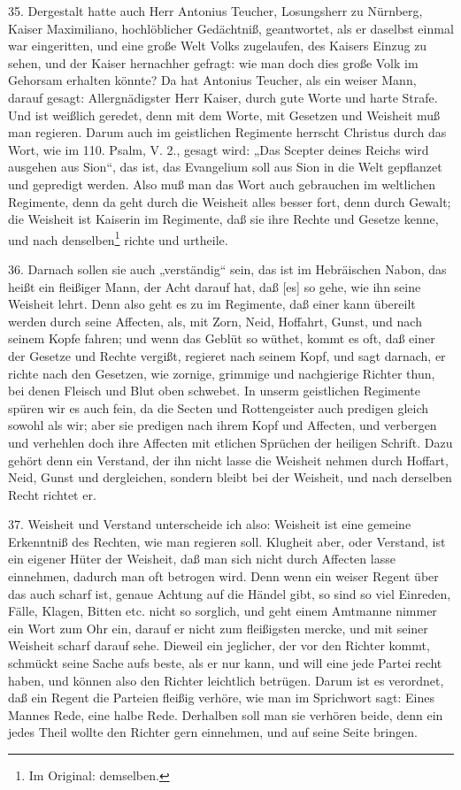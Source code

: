 35. Dergestalt hatte auch Herr Antonius Teucher, Losungsherr zu Nürnberg, Kaiser Maximiliano, hochlöblicher Gedächtniß, geantwortet, als er daselbst einmal war eingeritten, und eine große Welt Volks zugelaufen, des Kaisers Einzug zu sehen, und der Kaiser hernachher gefragt: wie man doch dies große Volk im Gehorsam erhalten könnte? Da hat Antonius Teucher, als ein weiser Mann, darauf gesagt: Allergnädigster Herr Kaiser, durch gute Worte und harte Strafe. Und ist weißlich geredet, denn mit dem Worte, mit Gesetzen und Weisheit muß man regieren. Darum auch im geistlichen Regimente herrscht Christus durch das Wort, wie im 110. Psalm, V. 2., gesagt wird: „Das Scepter deines Reichs wird ausgehen aus Sion“, das ist, das Evangelium soll aus Sion in die Welt gepflanzet und gepredigt werden. Also muß man das Wort auch gebrauchen im weltlichen Regimente, denn da geht durch die Weisheit alles besser fort, denn durch Gewalt; die Weisheit ist Kaiserin im Regimente, daß sie ihre Rechte und Gesetze kenne, und nach denselben\footnote{Im Original: demselben.} richte und urtheile.

36. Darnach sollen sie auch „verständig“ sein, das ist im Hebräischen Nabon, das heißt ein fleißiger Mann, der Acht darauf hat, daß [es] so gehe, wie ihn seine Weisheit lehrt. Denn also geht es zu im Regimente, daß einer kann übereilt werden durch seine Affecten, als, mit Zorn, Neid, Hoffahrt, Gunst, und nach seinem Kopfe fahren; und wenn das Geblüt so wüthet, kommt es oft, daß einer der Gesetze und Rechte
vergißt, regieret nach seinem Kopf, und sagt darnach, er richte nach den Gesetzen, wie zornige, grimmige und nachgierige Richter thun, bei denen Fleisch und Blut oben schwebet. In unserm geistlichen Regimente spüren wir es auch fein, da die Secten und Rottengeister auch predigen gleich sowohl als wir; aber sie predigen nach ihrem Kopf und Affecten, und verbergen und verhehlen doch ihre Affecten mit etlichen Sprüchen der heiligen Schrift. Dazu gehört denn ein Verstand, der ihn nicht lasse die Weisheit nehmen durch Hoffart, Neid, Gunst und dergleichen, sondern bleibt bei der Weisheit, und nach derselben Recht richtet er.

37. Weisheit und Verstand unterscheide ich also: Weisheit ist eine gemeine Erkenntniß des Rechten, wie man regieren soll. Klugheit aber, oder Verstand, ist ein eigener Hüter der Weisheit, daß man sich nicht durch Affecten lasse einnehmen, dadurch man oft betrogen wird. Denn wenn ein weiser Regent über das auch scharf ist, genaue Achtung auf die Händel gibt, so sind so viel Einreden, Fälle, Klagen, Bitten etc. nicht so sorglich, und geht einem Amtmanne nimmer ein Wort zum Ohr ein, darauf er nicht zum fleißigsten mercke, und mit seiner Weisheit scharf darauf sehe. Dieweil ein jeglicher, der vor den Richter kommt, schmückt seine Sache aufs beste, als er nur kann, und will eine jede Partei recht haben, und können also den Richter leichtlich betrügen. Darum ist es verordnet, daß ein Regent die Parteien fleißig verhöre, wie man im Sprichwort sagt: Eines Mannes Rede, eine halbe Rede. Derhalben soll man sie verhören beide, denn ein jedes Theil wollte den Richter gern einnehmen, und auf seine Seite bringen.


